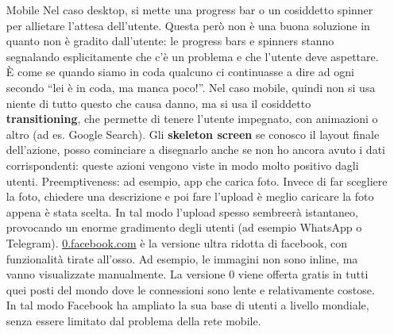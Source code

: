 \begin{enumerate}

\item[Mobile] Nel caso desktop, si mette una progress bar o un cosiddetto spinner per allietare l'attesa dell'utente. Questa per\`o non \`e una buona soluzione in quanto non \`e gradito dall'utente: le progress bars e spinners stanno segnalando esplicitamente che c'\`e un problema e che l'utente deve aspettare. \`E come se quando siamo in coda qualcuno ci continuasse a dire ad ogni secondo ``lei \`e in coda, ma manca poco!''. Nel caso mobile, quindi non si usa niente di tutto questo che causa danno, ma si usa il cosiddetto \textbf{transitioning}, che permette di tenere l'utente impegnato, con animazioni o altro (ad es. Google Search). Gli \textbf{skeleton screen} se conosco il layout finale dell'azione, posso cominciare a disegnarlo anche se non ho ancora avuto i dati corrispondenti: queste azioni vengono viste in modo molto positivo dagli utenti.  Preemptiveness: ad esempio, app che carica foto. Invece di far scegliere la foto, chiedere una descrizione e poi fare l'upload \`e meglio caricare la foto appena \`e stata scelta. In tal modo l'upload spesso sembreer\`a istantaneo, provocando un enorme gradimento degli utenti (ad esempio WhatsApp o Telegram). \url{0.facebook.com} \`e la versione ultra ridotta di facebook, con funzionalit\`a tirate all'osso. Ad esempio, le immagini non sono inline, ma vanno visualizzate manualmente. La versione 0 viene offerta gratis in tutti quei posti del mondo dove le connessioni sono lente e relativamente costose. In tal modo Facebook ha ampliato la sua base di utenti a livello mondiale, senza essere limitato dal problema della rete mobile.


\end{enumerate}
